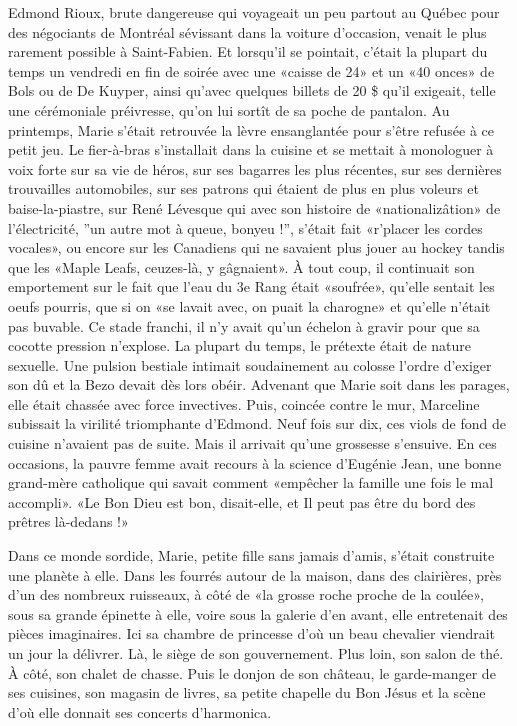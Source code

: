 Edmond Rioux, brute dangereuse qui voyageait un peu partout au Québec pour des négociants de Montréal sévissant dans la voiture d’occasion, venait le plus rarement possible à Saint-Fabien. Et lorsqu’il se pointait, c’était la plupart du temps un vendredi en fin de soirée avec une «caisse de 24» et un «40 onces» de Bols ou de De Kuyper, ainsi qu’avec quelques billets de 20 \$ qu’il exigeait, telle une cérémoniale préivresse, qu’on lui sortît de sa poche de pantalon. Au printemps, Marie s’était retrouvée la lèvre ensanglantée pour s’être refusée à ce petit jeu. Le fier-à-bras s’installait dans la cuisine et se mettait à monologuer à voix forte sur sa vie de héros, sur ses bagarres les plus récentes, sur ses dernières trouvailles automobiles, sur ses patrons qui étaient de plus en plus voleurs et baise-la-piastre, sur René Lévesque qui avec son histoire de «nationalizâtion» de l’électricité, ”un autre mot à queue, bonyeu !”, s’était fait «r’placer les cordes vocales», ou encore sur les Canadiens qui ne savaient plus jouer au hockey tandis que les «Maple Leafs, ceuzes-là, y gâgnaient». À tout coup, il continuait son emportement sur le fait que l’eau du 3e Rang était «soufrée», qu’elle sentait les oeufs pourris, que si on «se lavait avec, on puait la charogne» et qu’elle n’était pas buvable. Ce stade franchi, il n’y avait qu’un échelon à gravir pour que sa cocotte pression n’explose. La plupart du temps, le prétexte était de nature sexuelle. Une pulsion bestiale intimait soudainement au colosse l’ordre d’exiger son dû et la Bezo devait dès lors obéir. Advenant que Marie soit dans les parages, elle était chassée avec force invectives. Puis, coincée contre le mur, Marceline subissait la virilité triomphante d’Edmond. Neuf fois sur dix, ces viols de fond de cuisine n’avaient pas de suite. Mais il arrivait qu’une grossesse s’ensuive. En ces occasions, la pauvre femme avait recours à la science d’Eugénie Jean, une bonne grand-mère catholique qui savait comment «empêcher la famille une fois le mal accompli». «Le Bon Dieu est bon, disait-elle, et Il peut pas être du bord des prêtres là-dedans !»

Dans ce monde sordide, Marie, petite fille sans jamais d’amis, s’était construite une planète à elle. Dans les fourrés autour de la maison, dans des clairières, près d’un des nombreux ruisseaux, à côté de «la grosse roche proche de la coulée», sous sa grande épinette à elle, voire sous la galerie d’en avant, elle entretenait des pièces imaginaires. Ici sa chambre de princesse d’où un beau chevalier viendrait un jour la délivrer. Là, le siège de son gouvernement. Plus loin, son salon de thé. À côté, son chalet de chasse. Puis le donjon de son château, le garde-manger de ses cuisines, son magasin de livres, sa petite chapelle du Bon Jésus et la scène d’où elle donnait ses concerts d’harmonica.

